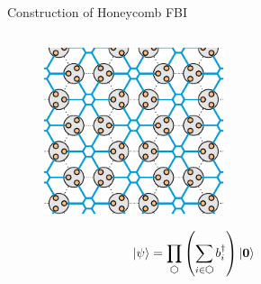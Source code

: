 \begin{frame}{Construction of Honeycomb FBI}
\vskip-1.5cm
\begin{columns}[T]
    \begin{column}[T]{.7\textwidth}
 	    \begin{figure}
			\includegraphics[width=0.6\textwidth]{diagrams/FI_PEPS.pdf}
			\end{figure}
			$$
\ket{\psi} = \prod\limits_{\varhexagon} \left(\sum\limits_{i \in \varhexagon} b^{\dagger}_i \right) \ket{\mathbf{0}}
			$$ 
    \end{column}
    \begin{column}[T]{.3\textwidth}
    \end{column}
\end{columns}
\end{frame}